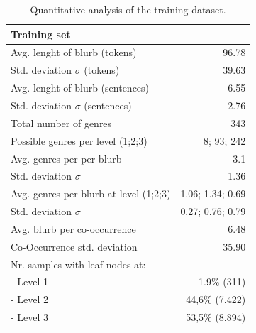 \documentclass[11pt,a4paper]{article}
\begin{document}
\begin{table}
\small
\begin{center}
\begin{tabular}{|l|r|}
\hline\centering\textbf{Training set}  &                        \\
\hline
Avg. lenght of blurb (tokens)              &  96.78             \\
Std. deviation $\sigma$ (tokens)           &  39.63             \\
Avg. lenght of blurb (sentences)           &  6.55              \\
Std. deviation $\sigma$ (sentences)        &  2.76              \\
\hline
Total number of genres                     &  343               \\
Possible genres per level (1;2;3)          &  8; 93; 242        \\
Avg. genres per per blurb                  &  3.1               \\
Std. deviation $\sigma$                    &  1.36              \\
Avg. genres per blurb at level (1;2;3)     &  1.06; 1.34; 0.69  \\
Std. deviation $\sigma$                    &  0.27; 0.76; 0.79  \\
\hline
Avg. blurb per co-occurrence               &  6.48              \\
Co-Occurrence std. deviation               & 35.90              \\
\hline
Nr. samples with leaf nodes at:            &                    \\
 - Level 1                                 & 1.9\% (311)        \\
 - Level 2                                 & 44,6\% (7.422)     \\
 - Level 3                                 & 53,5\% (8.894)     \\
\hline
\end{tabular}
\end{center}
\caption{\label{quantitivy-analysis-train}Quantitative analysis of the training dataset.}
\end{table}
\end{document}
